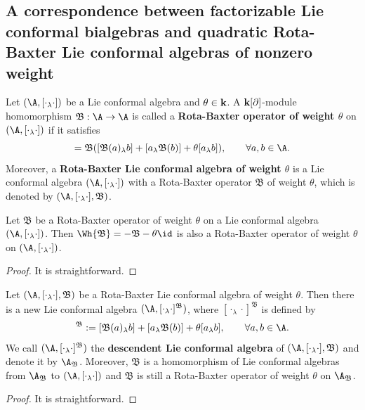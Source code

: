 \documentclass[12pt]{amsart}
\begin{document}
\subsection{A correspondence between factorizable Lie conformal bialgebras and quadratic Rota-Baxter Lie conformal algebras of nonzero weight}

    \begin{definition}\cite{HB}
Let $(\A,[\cdot_\lambda\cdot])$ be a Lie conformal algebra and
$\theta\in {\bf k}$. A ${\bf k}[\partial]$-module homomorphism
$\mathfrak{B}:\A\rightarrow \A$ is called a {\bf Rota-Baxter
operator of weight $\theta$}  on $(\A,[\cdot_\lambda\cdot])$ if it
satisfies
\begin{equation*}%
    [\mathfrak{B}(a)_\lambda \mathfrak{B}(b)]=\mathfrak{B}([\mathfrak{B}(a)_\lambda b]+[a_\lambda \mathfrak{B}(b)]+\theta[a_\lambda b]  ),\qquad \forall a,b\in \A.
\end{equation*}
Moreover, a {\bf   Rota-Baxter Lie conformal
algebra of weight  $\theta$} is a  Lie conformal algebra $(\A,[\cdot_\lambda\cdot])$
with a Rota-Baxter operator $\mathfrak{B}$ of weight $\theta$,
which is denoted by $(\A,[\cdot_\lambda\cdot],\mathfrak{B})$.

\end{definition}

 


\begin{lemma}\label{bb8}
Let $\mathfrak{B}$ be a Rota-Baxter operator of weight $\theta$ on
a Lie conformal algebra $(\A, [\cdot_\lambda \cdot])$. Then
$\Wh{\mathfrak{B}}=-\mathfrak{B}-\theta \id $ is also a
Rota-Baxter operator of weight $\theta$ on  $(\A, [\cdot_\lambda
\cdot])$.
\end{lemma}
\begin{proof}
It is straightforward.
\end{proof}


    \begin{proposition}\label{prop-2}
Let $(\A,[\cdot_\lambda\cdot],\mathfrak{B})$ be a
Rota-Baxter Lie conformal algebra of weight  $\theta$. Then there is
a new Lie conformal algebra
$(\A,[\cdot_\lambda\cdot]^\mathfrak{B})$, where
$[\cdot_\lambda\cdot]^\mathfrak{B}$ is defined by
\begin{eqnarray*}
    [a_\lambda b]^\mathfrak{B}:=[\mathfrak{B}(a)_\lambda b]+[a_\lambda \mathfrak{B}(b)]+\theta [a_\lambda b],\qquad \forall a,b\in \A.
\end{eqnarray*}
We call $(\A,[\cdot_\lambda \cdot ]^\mathfrak{B})$ the {\bf
descendent Lie conformal algebra} of
$(\A,[\cdot_\lambda\cdot],\mathfrak{B})$ and denote it by
$\A_\mathfrak{B}$. Moreover, $\mathfrak{B}$ is a homomorphism of
Lie conformal algebras from $\A_\mathfrak{B}$ to $(\A,
[\cdot_\lambda \cdot])$ and $\mathfrak{B}$ is still a Rota-Baxter
operator of weight $\theta$ on $\A_\mathfrak{B}$.

\end{proposition} 
\begin{proof}
It is straightforward.
\end{proof}
\end{document}
